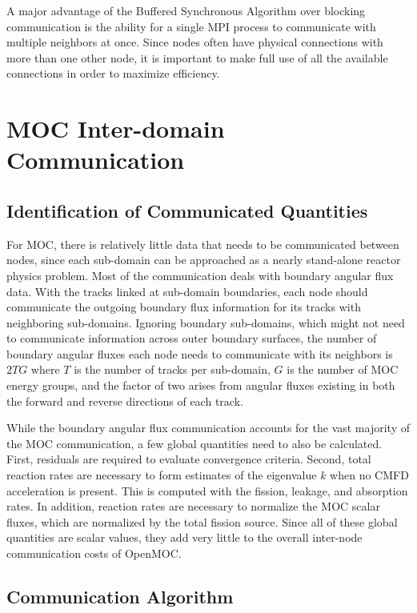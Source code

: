A major advantage of the Buffered Synchronous Algorithm over blocking communication is the ability for a single \ac{MPI} process to communicate with multiple neighbors at once. Since nodes often have physical connections with more than one other node, it is important to make full use of all the available connections in order to maximize efficiency.


\section{MOC Inter-domain Communication}
\label{sec:moc-dd}

\subsection{Identification of Communicated Quantities}

For \ac{MOC}, there is relatively little data that needs to be communicated between nodes, since each sub-domain can be approached as a nearly stand-alone reactor physics problem. Most of the communication deals with boundary angular flux data. With the tracks linked at sub-domain boundaries, each node should communicate the outgoing boundary flux information for its tracks with neighboring sub-domains. Ignoring boundary sub-domains, which might not need to communicate information across outer boundary surfaces, the number of boundary angular fluxes each node needs to communicate with its neighbors is $2TG$ where $T$ is the number of tracks per sub-domain, $G$ is the number of \ac{MOC} energy groups, and the factor of two arises from angular fluxes existing in both the forward and reverse directions of each track.

While the boundary angular flux communication accounts for the vast majority of the \ac{MOC} communication, a few global quantities need to also be calculated. First, residuals are required to evaluate convergence criteria. Second, total reaction rates are necessary to form estimates of the eigenvalue $k$ when no  \ac{CMFD} acceleration is present. This is computed with the fission, leakage, and absorption rates. In addition, reaction rates are necessary to normalize the \ac{MOC} scalar fluxes, which are normalized by the total fission source. Since all of these global quantities are scalar values, they add very little to the overall inter-node communication costs of OpenMOC.

\subsection{Communication Algorithm}

